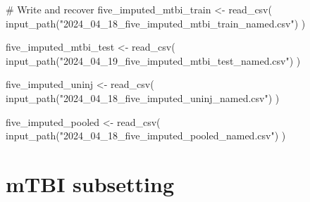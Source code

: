 \documentclass[
  letterpaper,
  DIV=11,
  numbers=noendperiod]{scrreprt}
\newenvironment{Shaded}{\begin{snugshade}}{\end{snugshade}}
\newcommand{\CommentTok}[1]{\textcolor[rgb]{0.37,0.37,0.37}{#1}}
\newcommand{\FunctionTok}[1]{\textcolor[rgb]{0.28,0.35,0.67}{#1}}
\newcommand{\NormalTok}[1]{\textcolor[rgb]{0.00,0.23,0.31}{#1}}
\newcommand{\OtherTok}[1]{\textcolor[rgb]{0.00,0.23,0.31}{#1}}
\newcommand{\StringTok}[1]{\textcolor[rgb]{0.13,0.47,0.30}{#1}}
\begin{document}
\begin{Shaded}
\begin{Highlighting}[]
\CommentTok{\# Write and recover}
\NormalTok{five\_imputed\_mtbi\_train }\OtherTok{\textless{}{-}} \FunctionTok{read\_csv}\NormalTok{(}
    \FunctionTok{input\_path}\NormalTok{(}\StringTok{"2024\_04\_18\_five\_imputed\_mtbi\_train\_named.csv"}\NormalTok{)}
\NormalTok{)}

\NormalTok{five\_imputed\_mtbi\_test }\OtherTok{\textless{}{-}} \FunctionTok{read\_csv}\NormalTok{(}
    \FunctionTok{input\_path}\NormalTok{(}\StringTok{"2024\_04\_19\_five\_imputed\_mtbi\_test\_named.csv"}\NormalTok{)}
\NormalTok{)}

\NormalTok{five\_imputed\_uninj }\OtherTok{\textless{}{-}} \FunctionTok{read\_csv}\NormalTok{(}
    \FunctionTok{input\_path}\NormalTok{(}\StringTok{"2024\_04\_18\_five\_imputed\_uninj\_named.csv"}\NormalTok{)}
\NormalTok{)}

\NormalTok{five\_imputed\_pooled }\OtherTok{\textless{}{-}} \FunctionTok{read\_csv}\NormalTok{(}
    \FunctionTok{input\_path}\NormalTok{(}\StringTok{"2024\_04\_18\_five\_imputed\_pooled\_named.csv"}\NormalTok{)}
\NormalTok{)}
\end{Highlighting}
\end{Shaded}

\chapter{mTBI subsetting}\label{mtbi-subsetting}
\end{document}
